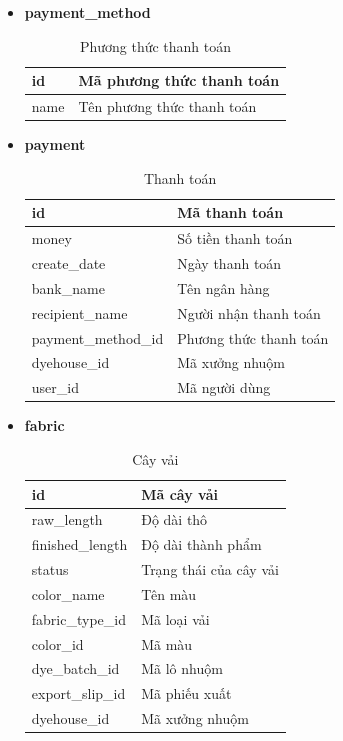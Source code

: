 \begin{itemize}
    \item \textbf{payment\_method}
    \begin{table}[H]
        \centering
        \begin{tabular}{|m{3cm}|m{10cm}|}
        \hline 
            id & Mã phương thức thanh toán\\ \hline
            name & Tên phương thức thanh toán\\ 
        \hline 
        \end{tabular}
        \caption{Phương thức thanh toán}
        \label{payment_method}
    \end{table}
    
    \item \textbf{payment}
    \begin{table}[H]
        \centering
        \begin{tabular}{|m{4cm}|m{9cm}|}
        \hline 
            id & Mã thanh toán\\ \hline
            money & Số tiền thanh toán\\ \hline
            create\_date & Ngày thanh toán \\ \hline
            bank\_name & Tên ngân hàng\\ \hline
            recipient\_name & Người nhận thanh toán\\ \hline
            payment\_method\_id & Phương thức thanh toán \\ \hline
            dyehouse\_id & Mã xưởng nhuộm\\ \hline
            user\_id & Mã người dùng\\ 
        \hline 
        \end{tabular}
        \caption{Thanh toán}
        \label{payment}
    \end{table}
    
    \item \textbf{fabric}
    \begin{table}[H]
        \centering
        \begin{tabular}{|m{3cm}|m{10cm}|}
        \hline 
            id & Mã cây vải\\ \hline
            raw\_length & Độ dài thô\\ \hline
            finished\_length & Độ dài thành phẩm \\ \hline
            status & Trạng thái của cây vải\\ \hline
            color\_name & Tên màu\\ \hline
            fabric\_type\_id & Mã loại vải\\ \hline
            color\_id & Mã màu \\ \hline
            dye\_batch\_id & Mã lô nhuộm\\ \hline
            export\_slip\_id & Mã phiếu xuất\\ \hline
            dyehouse\_id & Mã xưởng nhuộm\\ 
        \hline 
        \end{tabular}
        \caption{Cây vải}
        \label{fabric}
    \end{table}


\end{itemize}
